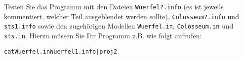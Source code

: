 Testen Sie das Programm mit den Dateien \texttt{Wuerfel?.info} (es ist
jeweils kommentiert, welcher Teil ausgeblendet werden sollte), 
\texttt{Colosseum?.info} und \texttt{sts1.info} sowie den zugehörigen 
Modellen \texttt{Wuerfel.in}, \texttt{Colosseum.in} und \texttt{sts.in}.
Hierzu müssen Sie Ihr Programm z.B. wie folgt aufrufen:
\begin{alltt}
   cat Wuerfel.in Wuerfel1.info | proj2
\end{alltt}

\begin{center}
  \resizebox{250pt}{!}{%
  }%
\end{center}
